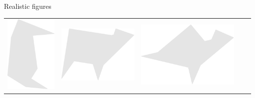 \documentclass[14pt]{beamer}
\begin{document}
\begin{frame}{Realistic figures}
\begin{center}
{\begin{tabular}{ccccc}
                \includegraphics[scale=0.20]{figures/figure026q.pdf}\!\!\!\! &
                \;\;\includegraphics[scale=0.20]{figures/figure026y.pdf} &
                \includegraphics[scale=0.20]{figures/figure026w.pdf} &

\end{tabular}}
\end{center}
\end{frame}
\end{document}
